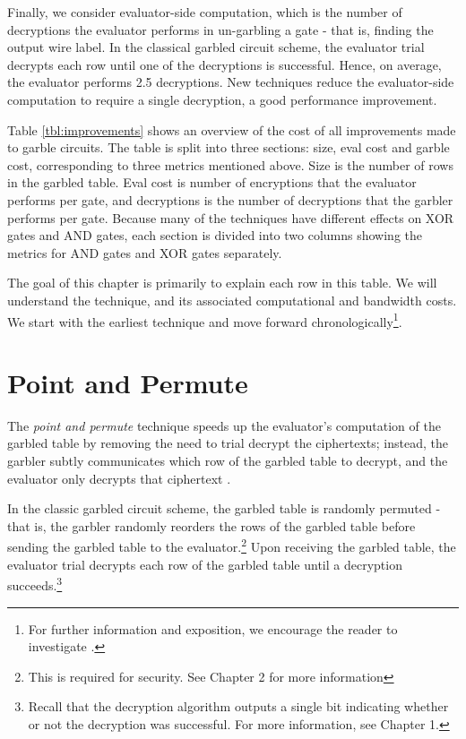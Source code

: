 Finally, we consider evaluator-side computation, which is the number of decryptions the evaluator performs in un-garbling a gate - that is, finding the output wire label.
In the classical garbled circuit scheme, the evaluator trial decrypts each row until one of the decryptions is successful.
Hence, on average, the evaluator performs 2.5 decryptions.
New techniques reduce the evaluator-side computation to require a single decryption, a good performance improvement.



Table \ref{tbl:improvements} shows an overview of the cost of all improvements made to garble circuits.
The table is split into three sections: size, eval cost and garble cost, corresponding to three metrics mentioned above.
Size is the number of rows in the garbled table.
Eval cost is number of encryptions that the evaluator performs per gate, and decryptions is the number of decryptions that the garbler performs per gate.
Because many of the techniques have different effects on XOR gates and AND gates, each section is divided into two columns showing the metrics for AND gates and XOR gates separately.

The goal of this chapter is primarily to explain each row in this table.
We will understand the technique, and its associated computational and bandwidth costs.
We start with the earliest technique and move forward chronologically\footnote{For further information and exposition, we encourage the reader to investigate \cite{mikes-video}.}.

\section{Point and Permute}

The \textit{point and permute} technique speeds up the evaluator's computation of the garbled table by removing the need to trial decrypt the ciphertexts; instead, the garbler subtly communicates which row of the garbled table to decrypt, and the evaluator only decrypts that ciphertext \cite{fairplay}.

In the classic garbled circuit scheme, the garbled table is randomly permuted - that is, the garbler randomly reorders the rows of the garbled table before sending the garbled table to the evaluator.\footnote{This is required for security. See Chapter 2 for more information}
Upon receiving the garbled table, the evaluator trial decrypts each row of the garbled table until a decryption succeeds.\footnote{Recall that the decryption algorithm outputs a single bit indicating whether or not the decryption was successful. For more information, see Chapter 1.}

